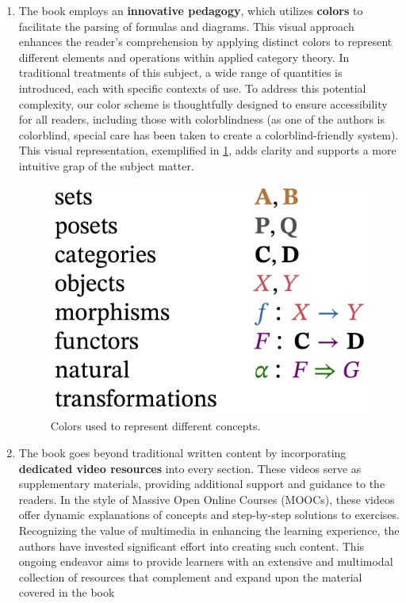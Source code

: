 \documentclass[10pt, article, one side]{memoir}
\begin{document}
\begin{enumerate}
        \item   The book employs an \textbf{innovative pedagogy}, which utilizes \textbf{colors} to facilitate the parsing of formulas and diagrams.
              This visual approach enhances the reader's comprehension by applying distinct colors to represent different elements and operations within applied category theory.
              In traditional treatments of this subject, a wide range of quantities is introduced, each with specific contexts of use.
              To address this potential complexity, our color scheme is thoughtfully designed to ensure accessibility for all readers, including those with colorblindness (as one of the authors is colorblind, special care has been taken to create a colorblind-friendly system).
              This visual representation, exemplified in \cref{fig:use-colors}, adds clarity and supports a more intuitive grap of the subject matter.

              \begin{figure}[h]
                  \begin{center}
                      \includegraphics[width=0.3\linewidth]{pics/use_colors}
                  \end{center}
                  \caption{Colors used to represent different concepts. \label{fig:use-colors}}
              \end{figure}
        \item The book goes beyond traditional written content by incorporating \textbf{dedicated video resources} into every section.
              These videos serve as supplementary materials, providing additional support and guidance to the readers.
              In the style of Massive Open Online Courses (MOOCs), these videos offer dynamic explanations of concepts and step-by-step solutions to exercises.
              Recognizing the value of multimedia in enhancing the learning experience, the authors have invested significant effort into creating such content.
              This ongoing endeavor aims to provide learners with an extensive and multimodal collection of resources that complement and expand upon the material covered in the book
    \end{enumerate}
\end{document}
